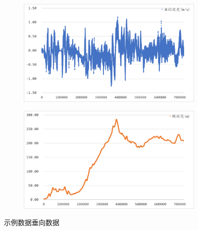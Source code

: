 \documentclass[10pt,a4paper]{ctexart}
\begin{document}
\begin{figure}[H]
    \centering
    {
        \begin{subfigure}{0.49\textwidth}
            \centering
            \includegraphics[width=\linewidth]{Figures/DataFigure/示例数据垂向速度.png}
        \end{subfigure}\hfill
        \begin{subfigure}{0.49\textwidth}
            \centering
            \includegraphics[width=\linewidth]{Figures/DataFigure/示例数据椭球高.png}
        \end{subfigure}
    }
    \caption{示例数据垂向数据}
    \label{fig:5.2}
\end{figure}
\end{document}
